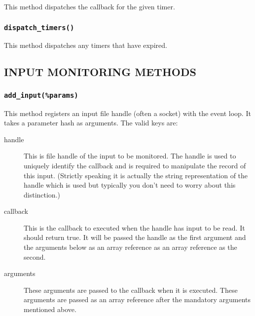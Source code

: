 \documentclass[12pt,a4paper]{article}
\begin{document}
This method dispatches the callback for the given timer.

\subsubsection*{\texttt{dispatch\_timers()}\label{xPL::Listener_dispatch_timers_}}


This method dispatches any timers that have expired.

\subsection*{INPUT MONITORING METHODS\label{xPL::Listener_INPUT_MONITORING_METHODS}}
\subsubsection*{\texttt{add\_input(\%params)}\label{xPL::Listener_add_input_params_}}


This method registers an input file handle (often a socket) with the
event loop.  It takes a parameter hash as arguments.  The valid keys
are:

\begin{description}

\item[{handle}] \mbox{}

This is file handle of the input to be monitored.  The handle is
used to uniquely identify the callback and is required to manipulate
the record of this input.  (Strictly speaking it is actually the
string representation of the handle which is used but typically
you don't need to worry about this distinction.)


\item[{callback}] \mbox{}

This is the callback to executed when the handle has input to be read.
It should return true.  It will be passed the handle as the first
argument and the arguments below as an array reference as an array
reference as the second.


\item[{arguments}] \mbox{}

These arguments are passed to the callback when it is executed.  These
arguments are passed as an array reference after the mandatory
arguments mentioned above.

\end{description}
\end{document}

